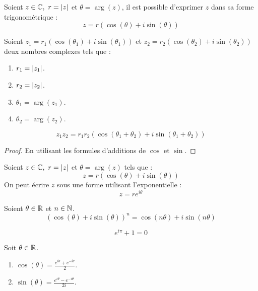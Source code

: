 \needspace{5cm}

\begin{definition}
	Soient $z \in \mathbb{C},\ r = \abs{z}$ et $\theta = \arg(z)$, il est possible d'exprimer $z$ dans sa forme trigonométrique :
	\[ z = r \left( \cos(\theta) + i \sin(\theta) \right) \]
\end{definition}

\begin{proposition}
	Soient $z_1 = r_1 \left( \cos(\theta_1) + i \sin(\theta_1) \right)$ et $z_2 = r_2 \left( \cos(\theta_2) + i \sin(\theta_2) \right)$ deux nombres complexes tels que :
	\begin{enumerate}
			\item $r_1 = \abs{z_1}$.
			\item $r_2 = \abs{z_2}$.
			\item $\theta_1 = \arg(z_1)$.
			\item $\theta_2 = \arg(z_2)$.
		\end{enumerate}
	\[ z_1 z_2 = r_1 r_2 \left( \cos(\theta_1+\theta_2) + i \sin(\theta_1+ \theta_2) \right) \]
\end{proposition}

\begin{proof}
	En utilisant les formules d'additions de $\cos$ et $\sin$.
\end{proof}

\begin{definition}
	Soient $z \in \mathbb{C},\ r = \abs{z}$ et $\theta = \arg(z)$ tels que :
	\[ z = r (\cos(\theta) + i \sin(\theta)) \]
	On peut écrire $z$ sous une forme utilisant l'exponentielle :
	\[ z = re^{i \theta} \]
\end{definition}

\begin{proposition}
	Soient $\theta \in \mathbb{R}$ et $n \in \mathbb{N}$.
	\[ (\cos(\theta) + i \sin(\theta))^n = \cos(n \theta) + i \sin(n \theta) \]
\end{proposition}

\begin{proposition}
	\[ e^{i\pi} + 1 = 0 \]
\end{proposition}

\begin{proposition}
	Soit $\theta \in \mathbb{R}$.
	\begin{enumerate}
			\item $\cos(\theta) = \frac{e^{i\theta} + e^{-i\theta}}{2}$.
			\item $\sin(\theta) = \frac{e^{i\theta} - e^{-i\theta}}{2i}$.
		\end{enumerate}
\end{proposition}

